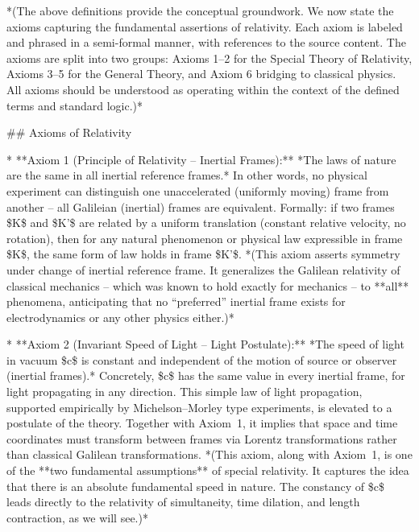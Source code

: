 \documentclass{article}
\begin{document}
*(The above definitions provide the conceptual groundwork. We now state the axioms capturing the fundamental assertions of relativity. Each axiom is labeled and phrased in a semi-formal manner, with references to the source content. The axioms are split into two groups: Axioms 1–2 for the Special Theory of Relativity, Axioms 3–5 for the General Theory, and Axiom 6 bridging to classical physics. All axioms should be understood as operating within the context of the defined terms and standard logic.)*

## Axioms of Relativity

* **Axiom 1 (Principle of Relativity – Inertial Frames):** *The laws of nature are the same in all inertial reference frames.* In other words, no physical experiment can distinguish one unaccelerated (uniformly moving) frame from another – all Galileian (inertial) frames are equivalent. Formally: if two frames \$K\$ and \$K'\$ are related by a uniform translation (constant relative velocity, no rotation), then for any natural phenomenon or physical law expressible in frame \$K\$, the same form of law holds in frame \$K'\$. *(This axiom asserts symmetry under change of inertial reference frame. It generalizes the Galilean relativity of classical mechanics – which was known to hold exactly for mechanics – to **all** phenomena, anticipating that no “preferred” inertial frame exists for electrodynamics or any other physics either.)*

* **Axiom 2 (Invariant Speed of Light – Light Postulate):** *The speed of light in vacuum \$c\$ is constant and independent of the motion of source or observer (inertial frames).* Concretely, \$c\$ has the same value in every inertial frame, for light propagating in any direction. This simple law of light propagation, supported empirically by Michelson–Morley type experiments, is elevated to a postulate of the theory. Together with Axiom 1, it implies that space and time coordinates must transform between frames via Lorentz transformations rather than classical Galilean transformations. *(This axiom, along with Axiom 1, is one of the **two fundamental assumptions** of special relativity. It captures the idea that there is an absolute fundamental speed in nature. The constancy of \$c\$ leads directly to the relativity of simultaneity, time dilation, and length contraction, as we will see.)*
\end{document}
